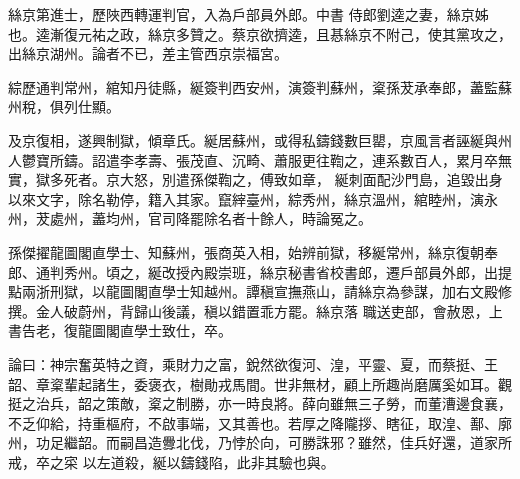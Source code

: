 \begin{pinyinscope}
 絲京第進士，歷陜西轉運判官，入為戶部員外郎。中書
 侍郎劉逵之妻，絲京姊也。逵漸復元祐之政，絲京多贊之。蔡京欲擠逵，且惎絲京不附己，使其黨攻之，出絲京湖州。論者不已，差主管西京崇福宮。



 綜歷通判常州，綰知丹徒縣，綖簽判西安州，演簽判蘇州，楶孫茇承奉郎，藎監蘇州稅，俱列仕顯。



 及京復相，遂興制獄，傾章氏。綖居蘇州，或得私鑄錢數巨罌，京風言者誣綖與州人鬱寶所鑄。詔遣李孝壽、張茂直、沉畸、蕭服更往鞫之，連系數百人，累月卒無實，獄多死者。京大怒，別遣孫傑鞫之，傅致如章，
 綖刺面配沙門島，追毀出身以來文字，除名勒停，籍入其家。竄縡臺州，綜秀州，絲京溫州，綰睦州，演永州，茇處州，藎均州，官司降罷除名者十餘人，時論冤之。



 孫傑擢龍圖閣直學士、知蘇州，張商英入相，始辨前獄，移綖常州，絲京復朝奉郎、通判秀州。頃之，綖改授內殿崇班，絲京秘書省校書郎，遷戶部員外郎，出提點兩浙刑獄，以龍圖閣直學士知越州。譚稹宣撫燕山，請絲京為參謀，加右文殿修撰。金人破蔚州，背歸山後議，稹以錯置乖方罷。絲京落
 職送吏部，會赦恩，上書告老，復龍圖閣直學士致仕，卒。



 論曰：神宗奮英特之資，乘財力之富，銳然欲復河、湟，平靈、夏，而蔡挺、王韶、章楶輩起諸生，委褒衣，樹勛戎馬間。世非無材，顧上所趣尚磨厲奚如耳。觀挺之治兵，韶之策敵，楶之制勝，亦一時良將。薛向雖無三子勞，而董漕邊食襄，不乏仰給，持重樞府，不啟事端，又其善也。若厚之降隴拶、瞎征，取湟、鄯、廓州，功足繼韶。而嗣昌造釁北伐，乃悖於向，可勝誅邪？雖然，佳兵好還，道家所戒，卒之寀
 以左道殺，綖以鑄錢陷，此非其驗也與。



\end{pinyinscope}